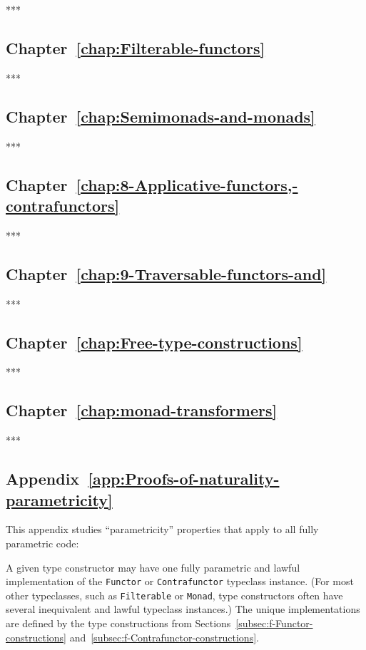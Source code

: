 {*}{*}{*}

\subsection{Chapter~\ref{chap:Filterable-functors}}

{*}{*}{*}

\subsection{Chapter~\ref{chap:Semimonads-and-monads}}

{*}{*}{*}

\subsection{Chapter~\ref{chap:8-Applicative-functors,-contrafunctors}}

{*}{*}{*}

\subsection{Chapter~\ref{chap:9-Traversable-functors-and}}

{*}{*}{*}

\subsection{Chapter~\ref{chap:Free-type-constructions}}

{*}{*}{*}

\subsection{Chapter~\ref{chap:monad-transformers}}

{*}{*}{*}

\subsection{Appendix~\ref{app:Proofs-of-naturality-parametricity}}

This appendix studies \textsf{``}parametricity\textsf{''} properties that apply to
all fully parametric code:

A given type constructor may have one fully parametric and lawful
implementation of the \lstinline!Functor! or \lstinline!Contrafunctor!
typeclass instance. (For most other typeclasses, such as \lstinline!Filterable!
or \lstinline!Monad!, type constructors often have several inequivalent
and lawful typeclass instances.) The unique implementations are defined
by the type constructions from Sections~\ref{subsec:f-Functor-constructions}
and~\ref{subsec:f-Contrafunctor-constructions}.

